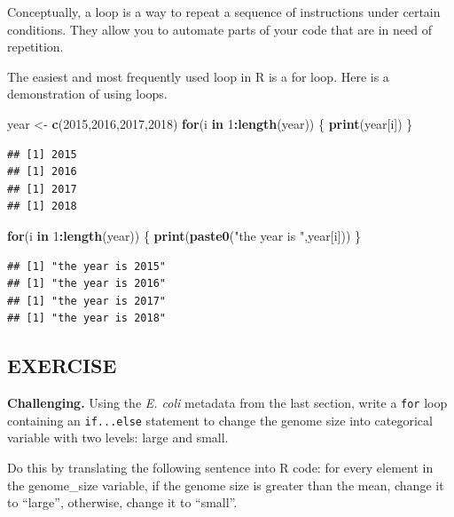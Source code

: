 \documentclass[
]{book}
\newenvironment{Shaded}{\begin{snugshade}}{\end{snugshade}}
\newcommand{\ControlFlowTok}[1]{\textcolor[rgb]{0.13,0.29,0.53}{\textbf{#1}}}
\newcommand{\DecValTok}[1]{\textcolor[rgb]{0.00,0.00,0.81}{#1}}
\newcommand{\KeywordTok}[1]{\textcolor[rgb]{0.13,0.29,0.53}{\textbf{#1}}}
\newcommand{\NormalTok}[1]{#1}
\newcommand{\OperatorTok}[1]{\textcolor[rgb]{0.81,0.36,0.00}{\textbf{#1}}}
\newcommand{\StringTok}[1]{\textcolor[rgb]{0.31,0.60,0.02}{#1}}
\begin{document}
Conceptually, a loop is a way to repeat a sequence of instructions under certain conditions. They allow you to automate parts of your code that are in need of repetition.

The easiest and most frequently used loop in R is a for loop. Here is a demonstration of using loops.

\begin{Shaded}
\begin{Highlighting}[]
\NormalTok{year <-}\StringTok{ }\KeywordTok{c}\NormalTok{(}\DecValTok{2015}\NormalTok{,}\DecValTok{2016}\NormalTok{,}\DecValTok{2017}\NormalTok{,}\DecValTok{2018}\NormalTok{)}
\ControlFlowTok{for}\NormalTok{(i }\ControlFlowTok{in} \DecValTok{1}\OperatorTok{:}\KeywordTok{length}\NormalTok{(year)) \{}
  \KeywordTok{print}\NormalTok{(year[i])}
\NormalTok{\}}
\end{Highlighting}
\end{Shaded}

\begin{verbatim}
## [1] 2015
## [1] 2016
## [1] 2017
## [1] 2018
\end{verbatim}

\begin{Shaded}
\begin{Highlighting}[]
\ControlFlowTok{for}\NormalTok{(i }\ControlFlowTok{in} \DecValTok{1}\OperatorTok{:}\KeywordTok{length}\NormalTok{(year)) \{}
  \KeywordTok{print}\NormalTok{(}\KeywordTok{paste0}\NormalTok{(}\StringTok{"the year is "}\NormalTok{,year[i]))}
\NormalTok{\}}
\end{Highlighting}
\end{Shaded}

\begin{verbatim}
## [1] "the year is 2015"
## [1] "the year is 2016"
## [1] "the year is 2017"
## [1] "the year is 2018"
\end{verbatim}

\hypertarget{exercise-1}{%
\subsection{EXERCISE}\label{exercise-1}}

\textbf{Challenging.} Using the \emph{E. coli} metadata from the last section, write a \texttt{for} loop containing an \texttt{if...else} statement to change the genome size into categorical variable with two levels: large and small.

Do this by translating the following sentence into R code: for every element in the genome\_size variable, if the genome size is greater than the mean, change it to ``large'', otherwise, change it to ``small''.
\end{document}
